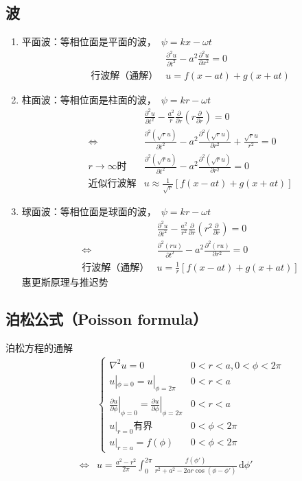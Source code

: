 \documentclass[12pt,a4paper]{article}
\newcommand\diff{\,\mathrm{d}}
\renewcommand{\[}{\ $\displaystyle}
\renewcommand{\]}{$\ }%
\newcommand{\pard}[2]{\ensuremath{\frac{\partial #1}{\partial #2}}}
\newcommand{\pardsq}[2]{\ensuremath{\frac{\partial^2 #1}{\partial #2^2}}}
\begin{document}
	\subsection{波}
		\begin{enumerate}
			\item 平面波：等相位面是平面的波，\[\psi = kx-\omega t\]
				\begin{eqnarray*}
				  &&\pardsq{u}{t} - a^2\pardsq{u}{x} = 0 \\
				  &\mbox{行波解（通解）}& u = f(x-at) + g(x+at)
				\end{eqnarray*}
			\item 柱面波：等相位面是柱面的波，\[\psi = kr-\omega t\]
				\begin{eqnarray*}
				&&\pardsq{u}{t} - \frac{a^2}{r}\pard{}{r}\left(r\pard{}{r}\right) = 0 \\
				&\Leftrightarrow &\pardsq{(\sqrt r u)}{t} - a^2\pardsq{(\sqrt r u)}{r} + \frac{\sqrt r u}{r^2}= 0 \\
				&r\to \infty \mbox{时}& \pardsq{(\sqrt r u)}{t} - a^2\pardsq{(\sqrt r u)}{r} = 0 \\
				&\mbox{近似行波解}& u \approx \frac 1{\sqrt r}[f(x-at) + g(x+at)]
				\end{eqnarray*}
			\item 球面波：等相位面是球面的波，\[\psi = kr-\omega t\]
				\begin{eqnarray*}
				&&\pardsq{u}{t} - \frac{a^2}{r^2}\pard{}{r}\left(r^2\pard{}{r}\right) = 0 \\
				&\Leftrightarrow &\pardsq{(ru)}{t} - a^2\pardsq{(ru)}{r} = 0 \\
				&\mbox{行波解（通解）}& u = \frac 1r[f(x-at) + g(x+at)]
				\end{eqnarray*}
				惠更斯原理与推迟势
		\end{enumerate}
	
	\subsection{泊松公式（Poisson formula）}
	  泊松方程的通解
		\begin{eqnarray*}
		&&\left\{\begin{array}{ll}
		\nabla^2 u = 0 &0<r<a,0<\phi <2\pi\\
		u|_{\phi = 0} =u|_{\phi = 2\pi} &0<r<a\\
		\left.\pard{u}{\phi}\right|_{\phi = 0} = \left.\pard{u}{\phi}\right|_{\phi = 2\pi} &0<r<a\\
		u|_{r=0}\mbox{有界} &0<\phi <2\pi \\
		u|_{r = a} = f(\phi) &0<\phi <2\pi
		\end{array}\right.\\
		&\Leftrightarrow& u = \frac{a^2 - r^2}{2\pi}\int_0^{2\pi}\frac{f(\phi')}{r^2 + a^2 - 2ar\cos(\phi - \phi')}\diff \phi'
		\end{eqnarray*}
		
\end{document}
